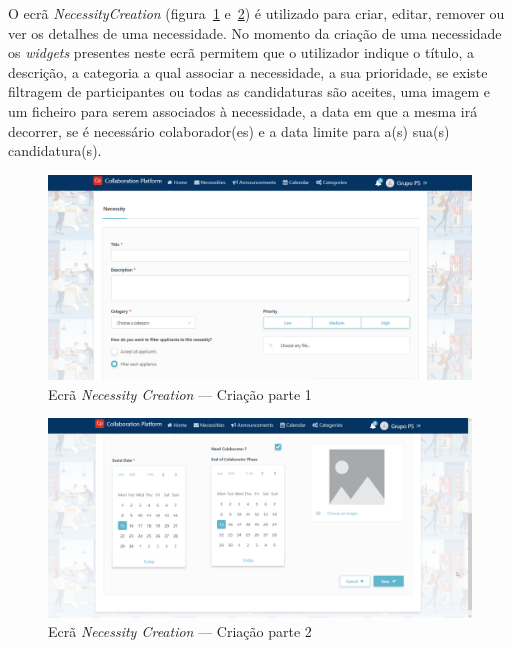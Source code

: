 O ecrã \textit{NecessityCreation} (figura~\ref{fig:necessityCreation1} e~\ref{fig:necessityCreation2}) é utilizado para criar, editar, remover ou ver os detalhes de uma necessidade.
No momento da criação de uma necessidade os \textit{widgets} presentes neste ecrã permitem que o utilizador indique o título, a descrição, a categoria a qual associar a necessidade, a sua prioridade, 
se existe filtragem de participantes ou todas as candidaturas são aceites, uma imagem e um ficheiro para serem associados à necessidade, a data em que a mesma irá decorrer, se é necessário colaborador(es) e a data limite para a(s) sua(s) candidatura(s).

\begin{figure}[H]
  \centering 
  \includegraphics[scale=0.4]{figures/NecessityCreation1.png}
  \caption{Ecrã \textit{Necessity Creation} --- Criação parte 1}\label{fig:necessityCreation1}
\end{figure}



\begin{figure}[H]
  \centering 
  \includegraphics[scale=0.3]{figures/NecessityCreation2.png}
  \caption{Ecrã \textit{Necessity Creation} --- Criação parte 2}\label{fig:necessityCreation2}
\end{figure}


